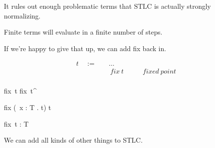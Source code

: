 \begin{frame}
  It rules out enough problematic terms that $\text{STLC}$ is actually strongly normalizing.
\end{frame}

\begin{frame}
  Finite terms will evaluate in a finite number of steps.
\end{frame}

\begin{frame}
  If we're happy to give that up, we can add fix back in.
\end{frame}

\begin{frame}
  \begin{mdframed}[frametitle={Terms}]
\begin{displaymath}
    \begin{aligned}
t \quad:=\quad& \ldots &\\
  & ~ fix~t \quad\quad &fixed~point\\
    \end{aligned}
\end{displaymath}
  \end{mdframed}
\end{frame}

\begin{frame}
  \begin{mdframed}[frametitle={Small-step semantics}]

  {fix~t \longrightarrow fix~t^{\prime}}

  \infrule[E-FixBeta]
  {}
  {fix
    \left(\lambda~x {:} T . t\right)
    \longrightarrow {}t}

  \end{mdframed}
\end{frame}

\begin{frame}
  \begin{mdframed}[frametitle={Typing rules}]

  {\vdash fix~t {:} T}

  \end{mdframed}
\end{frame}

\begin{frame}
 We can add all kinds of other things to STLC. 
\end{frame}

